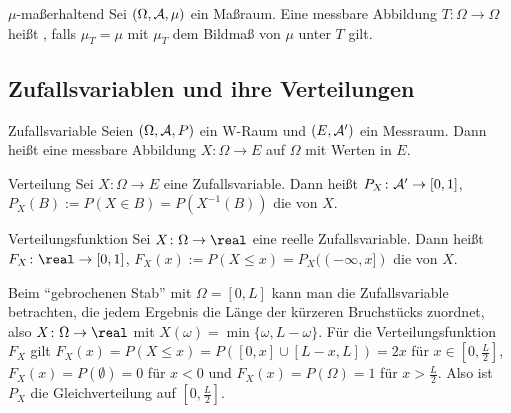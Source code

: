 \begin{Def}{$\mu$-maßerhaltend}
    Sei $(\Omega, \mathcal{A}, \mu)$ ein Maßraum.
    Eine messbare Abbildung $T\colon \Omega \rightarrow \Omega$ heißt ,
    falls $\mu_T = \mu$ mit $\mu_T$ dem Bildmaß von $\mu$ unter $T$ gilt.
\end{Def}

\pagebreak

\subsection{%
    Zufallsvariablen und ihre Verteilungen%
}

\begin{Def}{Zufallsvariable}
    Seien $(\Omega, \mathcal{A}, P)$ ein W-Raum und $(E, \mathcal{A}')$ ein Messraum.
    Dann heißt eine messbare Abbildung $X\colon \Omega \rightarrow E$
     auf $\Omega$ mit Werten in $E$.
\end{Def}

\begin{Def}{Verteilung}
    Sei $X\colon \Omega \rightarrow E$ eine Zufallsvariable.
    Dann heißt $P_X\colon \mathcal{A}' \rightarrow [0, 1]$, $P_X(B) := P(X \in B) = P(X^{-1}(B))$
    die  von $X$.
\end{Def}

\begin{Def}{Verteilungsfunktion}
    Sei $X\colon \Omega \rightarrow \real$ eine reelle Zufallsvariable.
    Dann heißt $F_X\colon \real \rightarrow [0, 1]$, $F_X(x) := P(X \le x) = P_X((-\infty, x])$
    die  von $X$.
\end{Def}

\begin{Bsp}
    Beim "`gebrochenen Stab"' mit $\Omega = [0, L]$ kann man die Zufallsvariable betrachten,
    die jedem Ergebnis die Länge der kürzeren Bruchstücks zuordnet, also
    $X\colon \Omega \rightarrow \real$ mit $X(\omega) = \min\{\omega, L - \omega\}$.
    Für die Verteilungsfunktion $F_X$ gilt $F_X(x) = P(X \le x) = P([0, x] \cup [L - x, L]) = 2x$
    für $x \in [0, \frac{L}{2}]$,
    $F_X(x) = P(\emptyset) = 0$ für $x < 0$ und $F_X(x) = P(\Omega) = 1$ für $x > \frac{L}{2}$.
    Also ist $P_X$ die Gleichverteilung auf $[0, \frac{L}{2}]$.
\end{Bsp}

\linie

